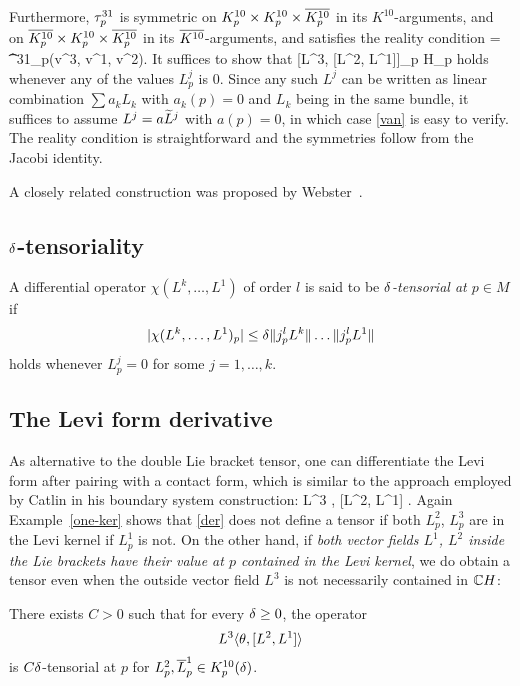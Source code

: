 \documentclass[12pt]{amsart}
\begin{document}
	Furthermore, $\tau^{31}_p$ is symmetric on $K^{10}_p\times K^{10}_p\times \overline{K^{10}_p}$ 
	in its $K^{10}$-arguments, 
	and on $\overline{K^{10}_p}\times K^{10}_p\times \overline{K^{10}_p}$ in its $\overline{K^{10}}$-arguments,  
	and satisfies the reality condition
\beq{}
	 = \t^{31}_p(\1v^3, \1v^1, \1v^2).
\eeq
\el
\bpf
It suffices to show that
\beq{}
	[L^3, [L^2, L^1]]_p \in \C H_p
\eeq
holds
whenever any of the values $L^j_p$ is $0$.
Since any such $L^j$ can be written as linear combination
$\sum a_k L_k$ with $a_k(p)=0$ and $L_k$ being in the same bundle,
it suffices to assume $L^j = a \widetilde{L}^j$ with $a(p)=0$,
in which case \eqref{van} is easy to verify.
The reality condition is straightforward and the symmetries follow
from the Jacobi identity.
\epf

A closely related construction 
was proposed by Webster~\cite{W}.



\subsection{$\delta$-tensoriality}

\bd
A differential operator $\chi(L^k, \ldots, L^1)$ of order $l$
 is said to be {\em $\delta$-tensorial at $p\in M$}  if 
$$
	|\chi(L^k, \ldots,  L^1)_p| \le \delta \|j^l_pL^k\| \ldots  \|j^l_pL^1\|
$$
holds whenever $L^j_p=0$ for some $j=1,\ldots, k$.
\ed



\subsection{The Levi form derivative}
As alternative to the double Lie bracket tensor, one can 
differentiate the Levi form after pairing with a contact form,
which is similar to the approach employed by Catlin 
in his boundary system construction:
\beq{}
	L^3 \la \th, [L^2, L^1] \ra.
\eeq
Again Example~\ref{one-ker} shows that \eqref{der}
does not define a tensor if both $L^2_p$, $L^3_p$
are in the Levi kernel if $L^1_p$ is not.
On the other hand, if {\em both vector fields
$L^1$, $L^2$ inside the Lie brackets
have their value at $p$ contained in the Levi kernel}, we do obtain a tensor
even when the outside vector field $L^3$ is not necessarily contained in ${\mathbb{C}} H$:


\bl{}
There exists $C>0$ such that for every $\delta\ge0$, the operator
$$
	L^3\langle \theta, [L^2, L^1] \rangle
$$
is $C\delta$-tensorial at $p$
for $L^2_p, \overline{L}^1_p \in K^{10}_p(\delta)$.
\end{document}
